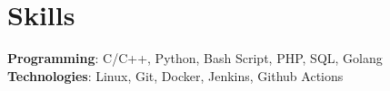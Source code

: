 \documentclass[A4,11pt]{article}
\begin{document}
\section{Skills}
 \begin{itemize}[leftmargin=0.5cm, label={}]
    \small{\item{
      \textbf{Programming}{: C/C++, Python, Bash Script, PHP, SQL, Golang} \\
      \textbf{Technologies}{: Linux, Git, Docker, Jenkins, Github Actions} \\
    }}
 \end{itemize}
    
\end{document}
